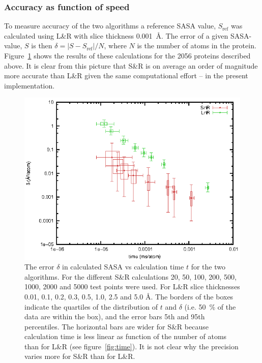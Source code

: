 \documentclass[a4paper,11pt]{article}
\begin{document}
\subsubsection{Accuracy as function of speed}\label{sec:accuracy}

To measure accuracy of the two algorithms a reference SASA value,
$S_\text{ref}$ was calculated using L\&R with slice thickness
0.001~Å. The error of a given SASA-value, $S$ is then $\delta = \lvert
S - S_\text{ref} \rvert / N$, where $N$ is the number of atoms in the
protein. Figure~\ref{fig:precision} shows the results of these
calculations for the 2056 proteins described above.  It is clear from
this picture that S\&R is on average an order of magnitude more
accurate than L\&R given the same computational effort -- in the
present implementation.

\begin{figure}
  \begin{center}
  \includegraphics{fig/precision}
  \caption{The error $\delta$ in calculated SASA vs calculation time
    $t$ for the two algorithms. For the different S\&R calculations
    20, 50, 100, 200, 500, 1000, 2000 and 5000 test points were
    used. For L\&R slice thicknesses 0.01, 0.1, 0.2, 0.3, 0.5, 1.0,
    2.5 and 5.0 Å. The borders of the boxes indicate the quartiles of
    the distribution of $t$ and $\delta$ (i.e. 50~\% of the data are
    within the box), and the error bars 5th and 95th percentiles.  The
    horizontal bars are wider for S\&R because calculation time is
    less linear as function of the number of atoms than for L\&R (see
    figure~\ref{fig:time}). It is not clear why the precision varies
    more for S\&R than for L\&R.
    \label{fig:precision}}
  \end{center}
\end{figure}
\end{document}
